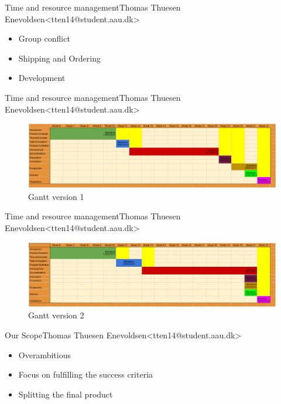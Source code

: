 \begin{frame}{Time and resource management}{Thomas Thuesen Enevoldsen\newline<tten14@student.aau.dk>}
	\begin{itemize}
		\item<2-> Group conflict
		\item<3-> Shipping and Ordering
		\item<4-> Development
	\end{itemize}
\end{frame}

\begin{frame}{Time and resource management}{Thomas Thuesen Enevoldsen\newline<tten14@student.aau.dk>}
		\begin{figure}[h!]
    	\includegraphics[width=1\textwidth]{images/gantt1.png}
    	\caption{Gantt version 1}
		\centering    		
	\end{figure}
\end{frame}

\begin{frame}{Time and resource management}{Thomas Thuesen Enevoldsen\newline<tten14@student.aau.dk>}
		\begin{figure}[h!]
    	\includegraphics[width=1\textwidth]{images/gantt2.png}
    	\caption{Gantt version 2}
		\centering    		
	\end{figure}
\end{frame}

\begin{frame}{Our Scope}{Thomas Thuesen Enevoldsen\newline<tten14@student.aau.dk>}
    \begin{itemize}
  	\item<2-> Overambitious
  	\item<3-> Focus on fulfilling the success criteria
  	\item<4-> Splitting the final product
  \end{itemize}
\end{frame}


